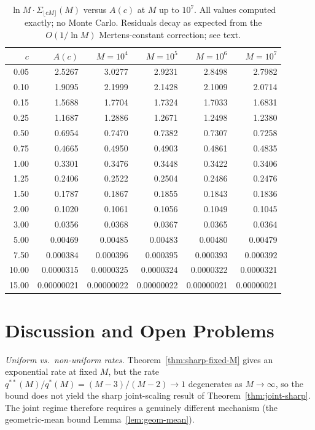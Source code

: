 \documentclass[11pt]{article}
\theoremstyle{remark}
\begin{document}
\begin{table}[!htbp]
\centering
\caption{$\ln M \cdot \Sigma_{\lfloor cM \rfloor}(M)$ versus $A(c)$ at $M$ up to $10^7$. All values computed exactly; no Monte Carlo. Residuals decay as expected from the $O(1/\ln M)$ Mertens-constant correction; see text.}
\label{tab:joint}
\small
\begin{tabular}{rrrrrr}
\toprule
$c$ & $A(c)$ & $M = 10^4$ & $M = 10^5$ & $M = 10^6$ & $M = 10^7$ \\
\midrule
0.05 & 2.5267 & 3.0277 & 2.9231 & 2.8498 & 2.7982 \\
0.10 & 1.9095 & 2.1999 & 2.1428 & 2.1009 & 2.0714 \\
0.15 & 1.5688 & 1.7704 & 1.7324 & 1.7033 & 1.6831 \\
0.25 & 1.1687 & 1.2886 & 1.2671 & 1.2498 & 1.2380 \\
0.50 & 0.6954 & 0.7470 & 0.7382 & 0.7307 & 0.7258 \\
0.75 & 0.4665 & 0.4950 & 0.4903 & 0.4861 & 0.4835 \\
1.00 & 0.3301 & 0.3476 & 0.3448 & 0.3422 & 0.3406 \\
1.25 & 0.2406 & 0.2522 & 0.2504 & 0.2486 & 0.2476 \\
1.50 & 0.1787 & 0.1867 & 0.1855 & 0.1843 & 0.1836 \\
2.00 & 0.1020 & 0.1061 & 0.1056 & 0.1049 & 0.1045 \\
3.00 & 0.0356 & 0.0368 & 0.0367 & 0.0365 & 0.0364 \\
5.00 & 0.00469 & 0.00485 & 0.00483 & 0.00480 & 0.00479 \\
7.50 & 0.000384 & 0.000396 & 0.000395 & 0.000393 & 0.000392 \\
10.00 & 0.0000315 & 0.0000325 & 0.0000324 & 0.0000322 & 0.0000321 \\
15.00 & 0.00000021 & 0.00000022 & 0.00000022 & 0.00000021 & 0.00000021 \\
\bottomrule
\end{tabular}
\end{table}

\section{Discussion and Open Problems}\label{sec:discussion}

\emph{Uniform vs.\ non-uniform rates.} Theorem~\ref{thm:sharp-fixed-M} gives an exponential rate at fixed $M$, but the rate $q^{**}(M)/q^{*}(M) = (M-3)/(M-2) \to 1$ degenerates as $M \to \infty$, so the bound does not yield the sharp joint-scaling result of Theorem~\ref{thm:joint-sharp}. The joint regime therefore requires a genuinely different mechanism (the geometric-mean bound Lemma~\ref{lem:geom-mean}).
\end{document}
